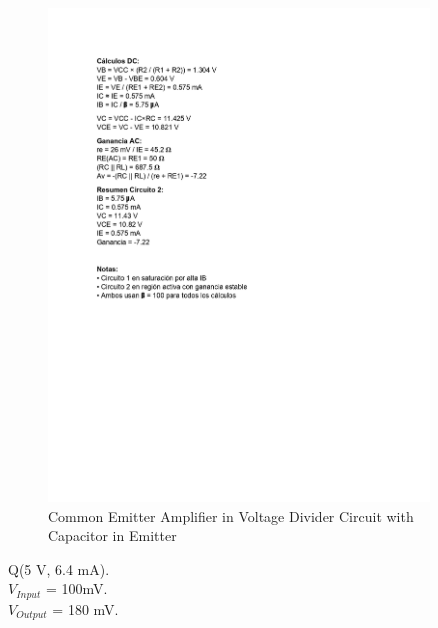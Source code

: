 \begin{figure}[H]
    \centering
    \includegraphics[width = 0.9\textwidth]{Imagenes/Imagenes_Santiago/BJT2.jpg}
    \caption{Common Emitter Amplifier in Voltage Divider Circuit with Capacitor in Emitter}
    \label{circuit1Tteorico2}
\end{figure}

\begin{center}
    Q(5 V, 6.4 mA). \\
    \texorpdfstring{$V_{Input}$}{Vinput} = 100mV. \\
    \texorpdfstring{$V_{Output}$}{Voutput} = 180 mV.
\end{center}